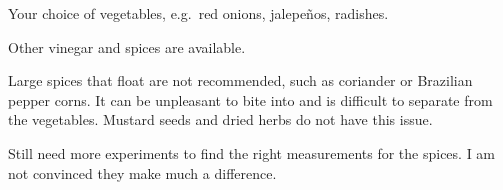\begin{variation}
	\item Your choice of vegetables, e.g.\ red onions, jalepe\~{n}os, radishes.
	\item Other vinegar and spices are available.
\end{variation}


\begin{experiments}
	\item Large spices that float are not recommended, such as coriander or Brazilian pepper corns.
		It can be unpleasant to bite into and is difficult to separate from the vegetables.
		Mustard seeds and dried herbs do not have this issue.
	\item Still need more experiments to find the right measurements for the spices.
		I am not convinced they make much a difference.
\end{experiments}

\recipeend%
